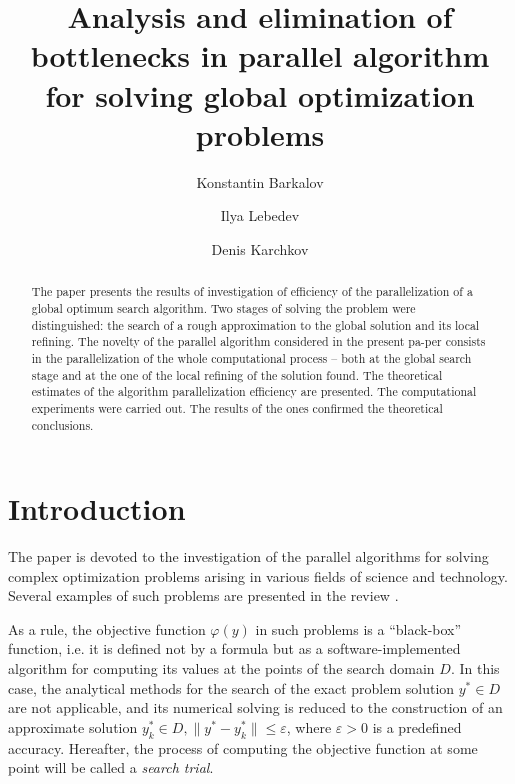 \documentclass[runningheads]{llncs}
\begin{document}
%
\title{Analysis and elimination of bottlenecks in parallel algorithm for solving global optimization problems}
%
%
\author{
Konstantin Barkalov  \and
Ilya Lebedev  \and
Denis Karchkov 
}
%
%

%
\maketitle              %
%
\begin{abstract}
The paper presents the results of investigation of efficiency of the parallelization of a global optimum search algorithm. Two stages of solving the problem were distinguished: the search of a rough approximation to the global solution and its local refining. The novelty of the parallel algorithm considered in the present pa-per consists in the parallelization of the whole computational process -- both at the global search stage and at the one of the local refining of the solution found. The theoretical estimates of the algorithm parallelization efficiency are presented. The computational experiments were carried out. The results of the ones confirmed the theoretical conclusions.

\end{abstract}
%
%
%
\section{Introduction}

The paper is devoted to the investigation of the parallel algorithms for solving complex optimization problems arising in various fields of science and technology. Several examples of such problems are presented in the review \cite{Pinter2006}.

As a rule, the objective function $\varphi(y)$ in such problems is a ``black-box'' function, i.e. it is defined not by a formula but as a software-implemented algorithm for computing its values at the points of the search domain $D$. In this case, the analytical methods for the search of the exact problem solution $y^{*}  \in D$ are not applicable, and its numerical solving is reduced to the construction of an approximate solution $y_k^* \in D, \|y^{*} - y_k^*\| \leq \varepsilon$, where $\varepsilon > 0$ is a predefined accuracy. Hereafter, the process of computing the objective function at some point will be called a \textit{search trial}.
\end{document}
